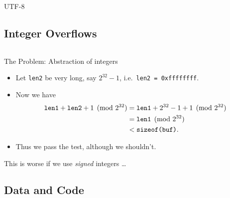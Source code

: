 \begin{frame}
  \begin{block}{UTF-8}
  \end{block}
\end{frame}


\subsection{Integer Overflows}

\begin{frame}[fragile]
  \inputminted{C}{combine.c}
\end{frame}

\begin{frame}
  \begin{alertblock}{The Problem: Abstraction of integers}
    \begin{itemize}
      \item Let \texttt{len2} be very long, say \(2^{32} - 1\), i.e.\ 
        \texttt{len2 = 0xffffffff}.

      \item Now we have
        \begin{align*}
          \text{\texttt{len1}} + \text{\texttt{len2}} 
          + 1 \pmod{2^{32}}
          &= \text{\texttt{len1}} + 2^{32} - 1 + 1 \pmod{2^{32}} \\
          &= \text{\texttt{len1}} \pmod{2^{32}} \\
          &< \text{\texttt{sizeof(buf)}}.
        \end{align*}

      \item Thus we pass the test, although we shouldn't.
    \end{itemize}
  \end{alertblock}
\end{frame}

\begin{frame}
  \begin{alertblock}
    This is worse if we use \emph{signed} integers \dots
  \end{alertblock}
\end{frame}

\subsection{Data and Code}

